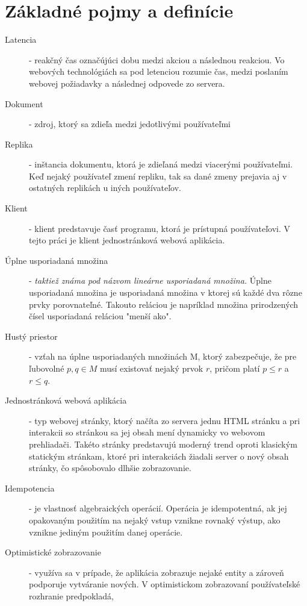\chapter{Základné pojmy a definície}

\label{kap:zakladne} %

\begin{description}
\item [Latencia] - reakčný čas označújúci dobu medzi akciou a následnou reakciou. Vo webových 
technológiách sa pod letenciou rozumie čas, medzi poslaním webovej požiadavky a následnej
odpovede zo servera.
\item [Dokument] - zdroj, ktorý sa zdieľa medzi jedotlivými používateľmi
\item [Replika] - inštancia dokumentu, ktorá je zdieľaná medzi viacerými používateľmi. Keď nejaký
používateľ zmení repliku, tak sa dané zmeny prejavia aj v ostatných replikách u iných
používateľov.
\item [Klient] - klient predstavuje časť programu, ktorá je prístupná používateľovi. V tejto práci
je klient jednostránková webová aplikácia.
\item [Úplne usporiadaná množina] - \textit{taktiež známa pod názvom lineárne usporiadaná množina.} 
Úplne usporiadaná množina je usporiadaná množina v ktorej sú každé dva rôzne prvky porovnateľné. 
Takouto reláciou je napríklad množina prirodzených čísel usporiadaná reláciou "menší ako".
\item [Hustý priestor] - vzťah na úplne usporiadaných množinách M, ktorý zabezpečuje, že pre 
ľubovolné $p, q \in M$ musí existovať nejaký prvok $r$, pričom platí $p \leq r$ a 
$r \leq q$.
\item [Jednostránková webová aplikácia] - typ webovej stránky, ktorý načíta zo servera jednu HTML
stránku a pri interakcii so stránkou sa jej obsah mení dynamicky vo webovom prehliadači. Takéto
stránky predstavujú moderný trend oproti klasickým statickým stránkam, ktoré pri interakciách
žiadali server o nový obsah stránky, čo spôsobovalo dlhšie zobrazovanie.
\item [Idempotencia] - je vlastnosť algebraických operácií. Operácia je idempotentná, ak jej
opakovaným použitím na nejaký vstup vznikne rovnaký výstup, ako vznikne jediným použitím danej
operácie.
\item [Optimistické zobrazovanie] - využíva sa v prípade, že aplikácia zobrazuje nejaké entity a
zároveň podporuje vytváranie nových. V optimistickom zobrazovaní používateľské rozhranie predpokladá,

\end{description}
